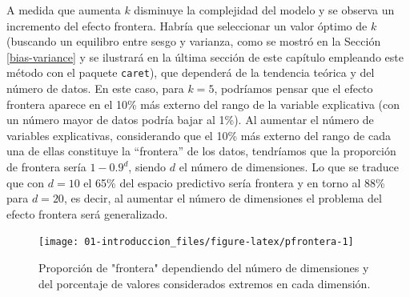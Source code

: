 \documentclass[
  spanish,
]{book}
\newenvironment{Shaded}{\begin{snugshade}}{\end{snugshade}}
\newcommand{\DataTypeTok}[1]{\textcolor[rgb]{0.13,0.29,0.53}{#1}}
\newcommand{\DecValTok}[1]{\textcolor[rgb]{0.00,0.00,0.81}{#1}}
\newcommand{\FloatTok}[1]{\textcolor[rgb]{0.00,0.00,0.81}{#1}}
\newcommand{\KeywordTok}[1]{\textcolor[rgb]{0.13,0.29,0.53}{\textbf{#1}}}
\newcommand{\NormalTok}[1]{#1}
\newcommand{\OperatorTok}[1]{\textcolor[rgb]{0.81,0.36,0.00}{\textbf{#1}}}
\newcommand{\OtherTok}[1]{\textcolor[rgb]{0.56,0.35,0.01}{#1}}
\newcommand{\StringTok}[1]{\textcolor[rgb]{0.31,0.60,0.02}{#1}}
\theoremstyle{break}
\theoremstyle{definition}
\theoremstyle{definition}
\theoremstyle{definition}
\theoremstyle{remark}
\begin{document}
A medida que aumenta \(k\) disminuye la complejidad del modelo y se observa un incremento del efecto frontera.
Habría que seleccionar un valor óptimo de \(k\) (buscando un equilibro entre sesgo y varianza, como se mostró en la Sección \ref{bias-variance} y se ilustrará en la última sección de este capítulo empleando este método con el paquete \texttt{caret}), que dependerá de la tendencia teórica y del número de datos.
En este caso, para \(k=5\), podríamos pensar que el efecto frontera aparece en el 10\% más externo del rango de la variable explicativa (con un número mayor de datos podría bajar al 1\%).
Al aumentar el número de variables explicativas, considerando que el 10\% más externo del rango de cada una de ellas constituye la ``frontera'' de los datos, tendríamos que la proporción de frontera sería \(1-0.9^d\), siendo \(d\) el número de dimensiones.
Lo que se traduce que con \(d = 10\) el 65\% del espacio predictivo sería frontera y en torno al 88\% para \(d=20\), es decir, al aumentar el número de dimensiones el problema del efecto frontera será generalizado.

\begin{Shaded}
\end{Shaded}

\begin{figure}[!htb]

{\centering \texttt{[image: 01-introduccion\_files/figure-latex/pfrontera-1]} 

}

\caption{Proporción de "frontera" dependiendo del número de dimensiones y del porcentaje de valores considerados extremos en cada dimensión.}\label{fig:pfrontera}
\end{figure}
\end{document}
